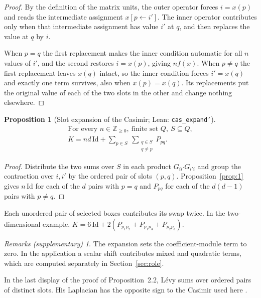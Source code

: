 \documentclass[11pt]{amsart}
\newcommand{\lean}[1]{\texttt{#1}}
\newcommand{\notlean}{supplementary}
\newtheorem{proposition}{Proposition}
\theoremstyle{definition}
\theoremstyle{remark}
\newtheorem*{remarks}{Remarks \textup{(\notlean)}}
\begin{document}
\begin{proof}
By the definition of the matrix units, the outer operator forces \(i=x(p)\)
and reads the intermediate assignment \(x[p\leftarrow i']\). The inner
operator contributes only when that intermediate assignment has value \(i'\)
at \(q\), and then replaces the value at \(q\) by \(i\).

When \(p=q\) the first replacement makes the inner condition automatic for
all \(n\) values of \(i'\), and the second restores \(i=x(p)\), giving
\(n f(x)\). When \(p\ne q\) the first replacement leaves \(x(q)\) intact, so
the inner condition forces \(i'=x(q)\) and exactly one term survives, also
when \(x(p)=x(q)\). Its replacements put the original value of each of the
two slots in the other and change nothing elsewhere.
\end{proof}

\begin{proposition}[Slot expansion of the Casimir; Lean: \lean{cas\_\allowbreak{}expand'}]\label{prop:2}
\[
\begin{gathered}
\text{For every }n\in\mathbb Z_{\ge0},\ \text{finite set }Q,\ S\subseteq Q,\\
K=nd\,\mathrm{Id}+
\sum_{p\in S}\ \sum_{\substack{q\in S\\q\ne p}}P_{pq}.
\end{gathered}
\]
\end{proposition}

\begin{proof}
Distribute the two sums over \(S\) in each product \(G_{ii'}G_{i'i}\) and
group the contraction over \(i,i'\) by the ordered pair of slots \((p,q)\).
Proposition~\ref{prop:1} gives \(n\,\mathrm{Id}\) for each of the \(d\) pairs
with \(p=q\) and \(P_{pq}\) for each of the \(d(d-1)\) pairs with \(p\ne q\).
\end{proof}

Each unordered pair of selected boxes contributes its swap twice. In the
two-dimensional example, \(K=6\,\mathrm{Id}+2(P_{p_1p_2}+P_{p_1p_3}+P_{p_2p_3})\).

\begin{remarks}
The expansion sets the coefficient-module term to zero. In the
application a scalar shift contributes mixed and quadratic terms, which
are computed separately in Section~\ref{sec:role}.

In the last display of the proof of Proposition~2.2, L\'evy sums over
ordered pairs of distinct slots. His Laplacian has the opposite sign to
the Casimir used here \cite[proof of Proposition~2.2, p.~6 of the preprint]{Levy}.
\end{remarks}
\end{document}
